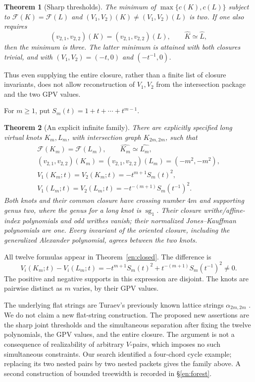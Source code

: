 \documentclass[12pt]{amsart}
\newtheorem{thm}{Theorem}[section]
\theoremstyle{definition}
\theoremstyle{remark}
\numberwithin{equation}{section}
\newcommand{\Package}{\mathcal F}
\newcommand{\sg}{\operatorname{sg}}
\newcommand{\clK}[1]{\widehat{#1}}
\begin{document}
\begin{thm}[Sharp thresholds]\label{en:minthm}
The minimum of $\max\{c(K),c(L)\}$ subject to
$\Package(K)=\Package(L)$ and $(V_1,V_2)(K)\ne(V_1,V_2)(L)$ is two.
If one also requires
\[
(v_{2,1},v_{2,2})(K)=(v_{2,1},v_{2,2})(L),\qquad
\clK K\simeq\clK L,
\]
then the minimum is three. The latter minimum is attained with both
closures trivial, and with $(V_1,V_2)=(-t,0)$ and $(-t^{-1},0)$.
\end{thm}
Thus even supplying the entire closure, rather than a finite list of
closure invariants, does not allow reconstruction of $V_1,V_2$ from the
intersection package and the two GPV values.

For $m\ge1$, put $S_m(t)=1+t+\cdots+t^{m-1}$.
\begin{thm}[An explicit infinite family]\label{en:main}
There are explicitly specified long virtual knots $K_m,L_m$, with
intersection graph $K_{2m,2m}$, such that
\begin{gather*}
\Package(K_m)=\Package(L_m),\qquad \clK {K_m}\simeq\clK {L_m},\\
(v_{2,1},v_{2,2})(K_m)=(v_{2,1},v_{2,2})(L_m)=(-m^2,-m^2),\\
V_1(K_m;t)=V_2(K_m;t)=-t^{m+1}S_m(t)^2,\\
V_1(L_m;t)=V_2(L_m;t)=-t^{-(m+1)}S_m(t^{-1})^2.
\end{gather*}
Both knots and their common closure have crossing number $4m$ and
supporting genus two, where the genus for a long knot is $\sg_1$.
Their closure writhe/affine-index polynomials and odd writhes vanish;
their normalized Jones--Kauffman polynomials are one.
Every invariant of the oriented closure, including the generalized
Alexander polynomial, agrees between the two knots.
\end{thm}
All twelve formulas appear in Theorem~\ref{en:closed}. The difference is
\begin{equation}\label{en:diff}
V_i(K_m;t)-V_i(L_m;t)
=-t^{m+1}S_m(t)^2+t^{-(m+1)}S_m(t^{-1})^2\ne0.
\end{equation}
The positive and negative supports in this expression are disjoint.
The knots are pairwise distinct as $m$ varies, by their GPV values.

The underlying flat strings are Turaev's previously known lattice strings
$\alpha_{2m,2m}$ \cite[\S3.3(1)]{Turaev}. We do not claim a new flat-string
construction. The proposed new assertions are the sharp joint thresholds
and the simultaneous separation after fixing the twelve polynomials, the
GPV values, and the entire closure. The argument is not a consequence of
realizability of arbitrary $V$-pairs, which imposes no such simultaneous
constraints. Our search identified a four-chord cycle example; replacing
its two nested pairs by two nested packets gives the family above.
A second construction of bounded treewidth is recorded in
\S\ref{en:forest}.
\end{document}
